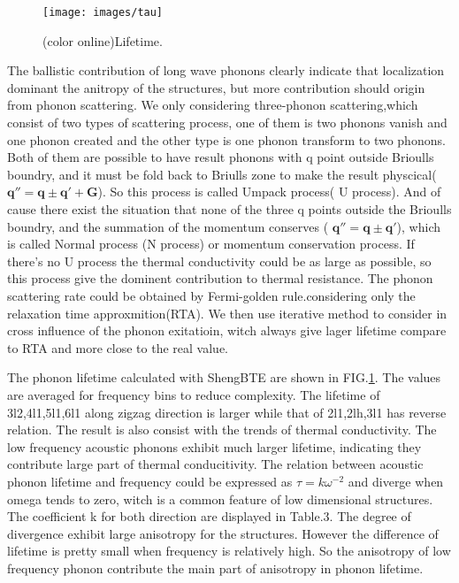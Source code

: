 \documentclass[%
 reprint,
 amsmath,amssymb,
 aps,
 prb,
]{revtex4-1}
\begin{document}
\begin{figure}[b]
  \texttt{[image: images/tau]}
  \caption{\label{fig:tau} (color online)Lifetime.}
\end{figure}

The ballistic contribution of long wave phonons clearly indicate that localization dominant the anitropy of the structures, but more contribution should origin from phonon scattering. We only considering three-phonon scattering,which consist of two types of scattering process, one of them is two phonons vanish and one phonon created and the other type is one phonon transform to two phonons. Both of them are possible to have result phonons with q point outside Brioulls boundry, and it must be fold back to Briulls zone to make the result physcical( $\mathbf{q''}=\mathbf{q} \pm \mathbf{q'}+\mathbf{G}$). So this process is called Umpack process( U process). And of cause there exist the situation that none of the three q points outside the Brioulls boundry, and the summation of the momentum conserves ( $\mathbf{q''}=\mathbf{q} \pm \mathbf{q'}$), which is called Normal process (N process) or momentum conservation process. If there's no U process the thermal conductivity could be as large as possible, so this process give the dominent contribution to thermal resistance. The phonon scattering rate could be obtained by Fermi-golden rule\cite{Li2014}.considering only the relaxation time approxmition(RTA). We then use iterative method to consider in cross influence of the phonon exitatioin, witch always give lager lifetime compare to RTA and more close to the real value.

The phonon lifetime calculated with ShengBTE\cite{Li2014} are shown in FIG.\ref{fig:tau}. The values are averaged for frequency bins to reduce complexity. The lifetime of 3l2,4l1,5l1,6l1 along zigzag direction is larger while that of 2l1,2lh,3l1 has reverse relation. The result is also consist with the trends of thermal conductivity. The low frequency acoustic phonons exhibit much larger lifetime, indicating they contribute large part of thermal conducitivity. The relation between acoustic phonon lifetime and frequency could be expressed as $\tau=k \omega^{-2}$ and diverge when omega tends to zero, witch is a common feature of low dimensional structures. The coefficient k for both direction are displayed in Table.3. The degree of divergence exhibit large anisotropy for the structures. However the difference of lifetime is pretty small when frequency is relatively high. So the anisotropy of low frequency phonon contribute the main part of anisotropy in phonon lifetime.
\end{document}
